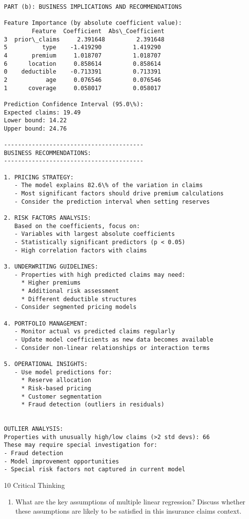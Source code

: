 \documentclass[8pt, twocolumn]{extarticle}
\providecommand{\tightlist}{%
      \setlength{\itemsep}{0pt}\setlength{\parskip}{0pt}}
\begin{document}
    \begin{Verbatim}[commandchars=\\\{\}]
PART (b): BUSINESS IMPLICATIONS AND RECOMMENDATIONS

Feature Importance (by absolute coefficient value):
        Feature  Coefficient  Abs\_Coefficient
3  prior\_claims     2.391648         2.391648
5          type    -1.419290         1.419290
4       premium     1.018707         1.018707
6      location     0.858614         0.858614
0    deductible    -0.713391         0.713391
2           age     0.076546         0.076546
1      coverage     0.058017         0.058017

Prediction Confidence Interval (95.0\%):
Expected claims: 19.49
Lower bound: 14.22
Upper bound: 24.76

----------------------------------------
BUSINESS RECOMMENDATIONS:
----------------------------------------

1. PRICING STRATEGY:
   - The model explains 82.6\% of the variation in claims
   - Most significant factors should drive premium calculations
   - Consider the prediction interval when setting reserves

2. RISK FACTORS ANALYSIS:
   Based on the coefficients, focus on:
   - Variables with largest absolute coefficients
   - Statistically significant predictors (p < 0.05)
   - High correlation factors with claims

3. UNDERWRITING GUIDELINES:
   - Properties with high predicted claims may need:
     * Higher premiums
     * Additional risk assessment
     * Different deductible structures
   - Consider segmented pricing models

4. PORTFOLIO MANAGEMENT:
   - Monitor actual vs predicted claims regularly
   - Update model coefficients as new data becomes available
   - Consider non-linear relationships or interaction terms

5. OPERATIONAL INSIGHTS:
   - Use model predictions for:
     * Reserve allocation
     * Risk-based pricing
     * Customer segmentation
     * Fraud detection (outliers in residuals)


OUTLIER ANALYSIS:
Properties with unusually high/low claims (>2 std devs): 66
These may require special investigation for:
- Fraud detection
- Model improvement opportunities
- Special risk factors not captured in current model
    \end{Verbatim}

    10 Critical Thinking

    \begin{enumerate}
\def\labelenumi{(\alph{enumi})}
\tightlist
\item
  What are the key assumptions of multiple linear regression? Discuss
  whether these assumptions are likely to be satisfied in this insurance
  claims context.
\end{enumerate}
\end{document}
